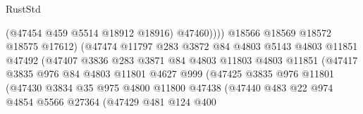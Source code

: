 \begin{lexlean}{RustStd}
\begin{coremodule}
                                            (@47454 @459 @5514 @18912 @18916)
                                            @47460))))
                                    @18566
                                    @18569
                                    @18572
                                    @18575
                                    @17612)
                                  (@47474
                                    @11797
                                    @283
                                    @3872
                                    @84
                                    @4803
                                    @5143
                                    @4803
                                    @11851
                                    @47492
                                    (@47407
                                      @3836
                                      @283
                                      @3871
                                      @84
                                      @4803
                                      @11803
                                      @4803
                                      @11851
                                      (@47417
                                        @3835
                                        @976
                                        @84
                                        @4803
                                        @11801
                                        @4627
                                        @999
                                        (@47425
                                          @3835
                                          @976
                                          @11801
                                          (@47430
                                            @3834
                                            @35
                                            @975
                                            @4800
                                            @11800
                                            @47438
                                            (@47440
                                              @483
                                              @22
                                              @974
                                              @4854
                                              @5566
                                              @27364
                                              (@47429
                                                @481
                                                @124
                                                @400

\end{coremodule}
\end{lexlean}
